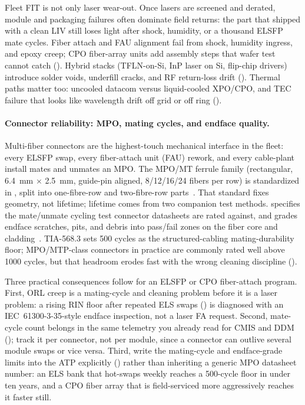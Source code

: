 Fleet FIT is not only laser wear-out. Once lasers are screened and derated,
module and packaging failures often dominate field returns: the part that shipped
with a clean LIV still loses light after shock, humidity, or a thousand ELSFP mate
cycles. Fiber attach and FAU alignment fail from shock, humidity ingress, and
epoxy creep; CPO fiber-array units add assembly steps that wafer test cannot catch
(). Hybrid stacks (TFLN-on-Si, InP laser on Si, flip-chip
drivers) introduce solder voids, underfill cracks, and RF return-loss drift
(). Thermal paths matter too: uncooled datacom
versus liquid-cooled XPO/CPO, and TEC failure that looks like wavelength drift off
grid or off ring ().

\paragraph{Connector reliability: MPO, mating cycles, and endface quality.}
\label{sec:connector-reliability}

Multi-fiber connectors are the highest-touch mechanical interface in the fleet:
every ELSFP swap, every fiber-attach unit (FAU) rework, and every cable-plant
install mates and unmates an MPO. The MPO/MT ferrule family (rectangular, 6.4~mm
$\times$ 2.5~mm, guide-pin aligned, 8/12/16/24 fibers per row) is standardized in
, split into one-fibre-row and two-fibre-row
parts~. That standard fixes geometry, not lifetime; lifetime
comes from two companion test methods.  specifies the
mate/unmate cycling test connector datasheets are rated against, and  grades endface scratches, pits, and debris into pass/fail zones on the
fiber core and cladding~. TIA-568.3 sets 500 cycles as the
structured-cabling
mating-durability floor; MPO/MTP-class connectors in practice are commonly rated
well above 1000 cycles, but that headroom erodes fast with the wrong cleaning
discipline ().

Three practical consequences follow for an ELSFP or CPO fiber-attach program.
First, ORL creep is a mating-cycle and cleaning problem before it is a laser
problem: a rising RIN floor after repeated ELS swaps () is
diagnosed with an IEC~61300-3-35-style endface inspection, not a laser FA request.
Second, mate-cycle count belongs in the same telemetry you already read for CMIS
and DDM (); track it per connector, not per module, since a
connector can outlive several module swaps or vice versa. Third, write the
mating-cycle and endface-grade limits into the ATP explicitly
() rather than inheriting a generic MPO datasheet number: an
ELS bank that hot-swaps weekly reaches a 500-cycle floor in under ten years, and a
CPO fiber array that is field-serviced more aggressively reaches it faster still.

